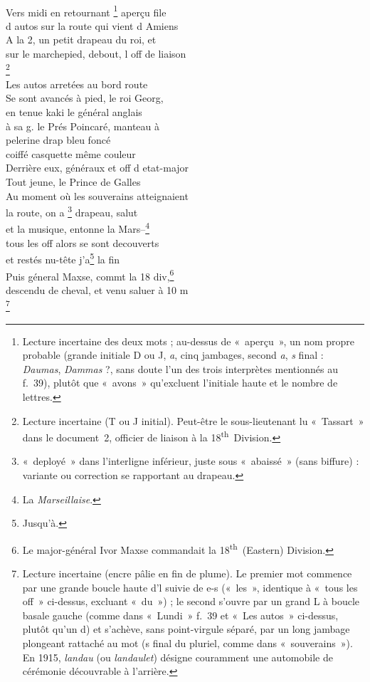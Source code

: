 \begin{LJlettre}
\noindent{} \hfill {}\\
Vers midi en  retournant \footnote{Lecture incertaine des deux mots ; au-dessus de «~aperçu~», un nom propre probable (grande initiale D ou J, \textit{a}, cinq jambages, second \textit{a}, \textit{s} final : \textit{Daumas}, \textit{Dammas} ?, sans doute l'un des trois interprètes mentionnés au f.~39), plutôt que «~avons~» qu'excluent l'initiale haute et le nombre de lettres.} aperçu file\\
d autos sur la route qui vient d Amiens\\
A la 2, un petit drapeau du roi, et\\
sur le marchepied, debout, l off de liaison\\
\footnote{Lecture incertaine (T ou J initial). Peut-être le sous-lieutenant lu «~Tassart~» dans le document~2, officier de liaison à la 18\textsuperscript{th}~Division.}\\
Les autos arretées au bord route\\
Se sont avancés à pied, le roi Georg,\\
en tenue kaki le général anglais\\[\baselineskip]
à sa g. le Prés Poincaré, manteau à\\
pelerine drap bleu foncé\\
coiffé casquette même couleur\\
Derrière eux, généraux et off d etat-major\\
Tout jeune, le Prince de Galles\\
Au moment où les souverains atteignaient\\
la route, on a  \footnote{«~deployé~» dans l'interligne inférieur, juste sous «~abaissé~» (sans biffure) : variante ou correction se rapportant au drapeau.} drapeau, salut\\
et la musique, entonne la Mars--\footnote{La \textit{Marseillaise}.}\\
tous les off alors se sont decouverts\\
et restés nu-tête j'a\footnote{Jusqu'à.} la fin\\
Puis géneral Maxse, commt la 18 div,\footnote{Le major-général Ivor Maxse commandait la 18\textsuperscript{th}~(Eastern) Division.}\\
descendu de cheval, et venu saluer à 10 m\\
 \footnote{Lecture incertaine (encre pâlie en fin de plume). Le premier mot commence par une grande boucle haute d'l suivie de e-s («~les~», identique à «~tous les off~» ci-dessus, excluant «~du~») ; le second s'ouvre par un grand L à boucle basale gauche (comme dans «~Lundi~» f.~39 et «~Les autos~» ci-dessus, plutôt qu'un d) et s'achève, sans point-virgule séparé, par un long jambage plongeant rattaché au mot (s final du pluriel, comme dans «~souverains~»). En 1915, \textit{landau} (ou \textit{landaulet}) désigne couramment une automobile de cérémonie découvrable à l'arrière.}
\end{LJlettre}

